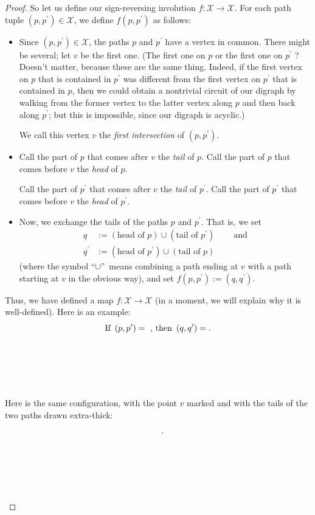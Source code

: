 \begin{definition}
\begin{proof}
So let us define our sign-reversing involution $f:\mathcal{X}\rightarrow
\mathcal{X}$. For each path tuple $\left(  p,p^{\prime}\right)  \in
\mathcal{X}$, we define $f\left(  p,p^{\prime}\right)  $ as follows:

\begin{itemize}
\item Since $\left(  p,p^{\prime}\right)  \in\mathcal{X}$, the paths $p$ and
$p^{\prime}$ have a vertex in common. There might be several; let $v$ be the
first one. (The first one on $p$ or the first one on $p^{\prime}$ ? Doesn't
matter, because these are the same thing. Indeed, if the first vertex on $p$
that is contained in $p^{\prime}$ was different from the first vertex on
$p^{\prime}$ that is contained in $p$, then we could obtain a nontrivial
circuit of our digraph by walking from the former vertex to the latter vertex
along $p$ and then back along $p^{\prime}$; but this is impossible, since our
digraph is acyclic.)

We call this vertex $v$ the \emph{first intersection} of $\left(  p,p^{\prime
}\right)  $.

\item Call the part of $p$ that comes after $v$ the \emph{tail} of $p$. Call
the part of $p$ that comes before $v$ the \emph{head}\textbf{ }of $p$.

Call the part of $p^{\prime}$ that comes after $v$ the \emph{tail} of
$p^{\prime}$. Call the part of $p^{\prime}$ that comes before $v$ the
\emph{head}\textbf{ }of $p^{\prime}$.

\item Now, we exchange the tails of the paths $p$ and $p^{\prime}$. That is,
we set%
\begin{align*}
q  &  :=\left(  \text{head of }p\right)  \cup\left(  \text{tail of }p^{\prime
}\right)  \ \ \ \ \ \ \ \ \ \ \text{and}\\
q^{\prime}  &  :=\left(  \text{head of }p^{\prime}\right)  \cup\left(
\text{tail of }p\right)
\end{align*}
(where the symbol \textquotedblleft$\cup$\textquotedblright\ means combining a
path ending at $v$ with a path starting at $v$ in the obvious way), and set
$f\left(  p,p^{\prime}\right)  :=\left(  q,q^{\prime}\right)  $.
\end{itemize}

Thus, we have defined a map $f:\mathcal{X}\rightarrow\mathcal{X}$ (in a
moment, we will explain why it is well-defined). Here is an example:
\[
\text{If }\left(  p,p^{\prime}\right)  =%
\raisebox{-6pc}{
}%
\text{, then }\left(  q,q^{\prime}\right)  =%
\raisebox{-6pc}{%
}%
\text{.}%
\]
Here is the same configuration, with the point $v$ marked and with the tails
of the two paths drawn extra-thick:%
\[%
\raisebox{-6pc}{
}%
\ \ .
\]



\end{proof}
\end{definition}
